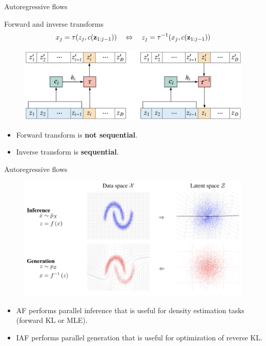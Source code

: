\begin{frame}{Autoregressive flows}
	\begin{block}{Forward and inverse transforms}
		\[
		x_j = \tau (z_j, c(\mathbf{z}_{1:j-1})) \quad \Leftrightarrow \quad z_j = \tau^{-1} (x_j, c(\mathbf{z}_{1:j-1}))
		\]
		\begin{figure}
			\includegraphics[width=\linewidth]{figs/autoregressive_flow}
		\end{figure}
	\end{block}
	\begin{itemize}
		\item Forward transform is \textbf{not sequential}.
		\item Inverse transform is \textbf{sequential}.
	\end{itemize}
	
\end{frame}
\begin{frame}{Autoregressive flows}
	\begin{figure}
		\includegraphics[width=0.8\linewidth]{figs/flows_how2.png}
	\end{figure}
	\begin{itemize}	
		\item AF performs parallel inference that is useful for density estimation tasks (forward KL or MLE).
		\item IAF performs parallel generation that is useful for optimization of reverse KL.
	\end{itemize}
	
\end{frame}
